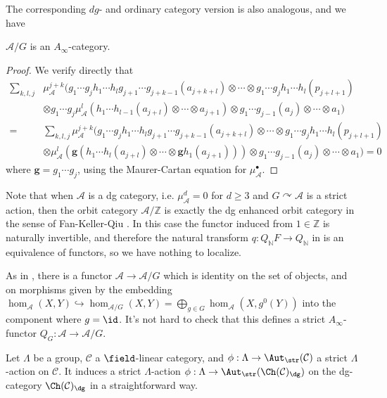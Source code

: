 The corresponding $dg$- and ordinary category version is also analogous, and we have
\begin{lmm}
    $\mathcal{A}/G$ is an $A_{\infty}$-category.
\end{lmm}
\begin{proof}
    We verify directly that\begin{align*}
        \sum_{k,l,j}&\mu^{j+k}_{\mathcal{A}}(g_1\dotsb g_j h_1\dotsb h_l g_{j+1}\dotsb g_{j+k-1} (a_{j+k+l})\otimes\dotsb\otimes g_1\dotsb g_j h_1\dotsb h_l (p_{j+l+1})\\ 
        &\otimes g_1\dotsb g_j\mu^l_{\mathcal{A}}(h_1\dotsb h_{l-1} (a_{j+l})\otimes\dotsb\otimes a_{j+1})\otimes g_1\dotsb g_{j-1} (a_j)\otimes\dotsb\otimes a_1)\\ 
        =&\sum_{k,l,j}\mu_{\mathcal{A}}^{j+k}(g_1\dotsb g_j h_1\dotsb h_l g_{j+1}\dotsb g_{j+k-1} (a_{j+k+l})\otimes\dotsb\otimes g_1\dotsb g_j h_1\dotsb h_l (p_{j+l+1})\\ 
        &\otimes\mu^l_{\mathcal{A}}\left(\mathbf{g}(h_1\dotsb h_l(a_{j+l})\otimes\dotsb\otimes\mathbf{g} h_1 (a_{j+1}))\right)\otimes g_1\dotsb g_{j-1} (a_j)\otimes\dotsb\otimes a_1)=0
    \end{align*}
    where $\mathbf{g}=g_1\dotsb g_j$, using the Maurer-Cartan equation for $\mu_{\mathcal{A}}^{\bullet}$.
\end{proof}
Note that when $\mathcal{A}$ is a dg category, i.e. $\mu_{\mathcal{A}}^d=0$ for $d\geq 3$ and $G\curvearrowright\mathcal{A}$ is a strict action, then the orbit category $\mathcal{A}/\mathbb{Z}$ is exactly the dg enhanced orbit category in the sense of Fan-Keller-Qiu \cite{FKQ24}. In this case the functor induced from $1\in\mathbb{Z}$ is naturally invertible, and therefore the natural transform $q\colon Q_{\mathbb{N}}F\to Q_{\mathbb{N}}$ in \cite{FKQ24} is an equivalence of functors, so we have nothing to localize.\par
As in \cite{FKQ24}, there is a functor $\mathcal{A}\to\mathcal{A}/G$ which is identity on the set of objects, and on morphisms given by the embedding $\hom_{\mathcal{A}} (X,Y)\hookrightarrow\hom_{\mathcal{A}/G} (X,Y)=\displaystyle\bigoplus_{g\in G}\hom_{\mathcal{A}} (X,g^0(Y))$ into the component where $g=\id$. It's not hard to check that this defines a strict $A_{\infty}$-functor $Q_G\colon\mathcal{A}\to\mathcal{A}/G$.
\begin{exmp}
Let $\Lambda$ be a group,
$\mathcal{C}$ a $\field$-linear category,
and
$\phi:\Lambda\rightarrow\Aut_{\str}(\mathcal{C})$
a strict $\Lambda$-action on $\mathcal{C}$.
It induces a strict $\Lambda$-action
$\phi:\Lambda\rightarrow\Aut_{\str}(\Ch(\mathcal{C})_{\dg})$
on the dg-category $\Ch(\mathcal{C})_{\dg}$
in a straightforward way.
\end{exmp}

